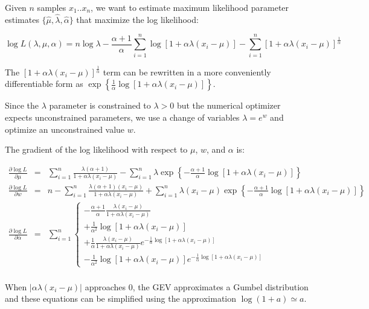 Given $n$ samples $x_1..x_n$, we want to estimate maximum likelihood
parameter estimates $\{ \hat{\mu}, \hat{\lambda}, \hat{\alpha} \}$
that maximize the log likelihood:

\begin{equation}
\log L(\lambda, \mu, \alpha) = n \log \lambda 
       - \frac{\alpha+1}{\alpha} 
           \sum_{i=1}^{n} \log\left[1+ \alpha\lambda(x_i - \mu) \right]
       - \sum_{i=1}^{n} \left[ 1 + \alpha\lambda (x_i - \mu) \right]^{\frac{1}{\alpha}}
\label{eqn:gev_logL}
\end{equation}

The $\left[ 1 + \alpha\lambda (x_i - \mu) \right]^{\frac{1}{\alpha}}$
term can be rewritten in a more conveniently differentiable form as
$\exp \left\{ \frac{1}{\alpha} \log \left[ 1 + \alpha\lambda (x_i - \mu)
\right] \right\}$.

Since the $\lambda$ parameter is constrained to $\lambda > 0$ but the
numerical optimizer expects unconstrained parameters, we use a change
of variables $\lambda = e^w$ and optimize an unconstrained value $w$.

The gradient of the log likelihood with respect to $\mu$, $w$, and
$\alpha$ is:

\begin{eqnarray}
\frac{\partial \log L}{\partial \mu} & = &
  \sum_{i=1}^n \frac{\lambda (\alpha+1)}{1+\alpha\lambda(x_i-\mu)} 
 -\sum_{i=1}^n \lambda \exp 
    \left\{ -\frac{\alpha+1}{\alpha} \log
          \left[1+\alpha\lambda(x_i-\mu)\right] \right\}
\\%
\label{eqn:gev_mupartial}
\frac{\partial \log L}{\partial w} & = &
  n - \sum_{i=1}^{n} \frac{\lambda (\alpha+1) (x_i - \mu)} 
                          {1 + \alpha \lambda (x_i - \mu)}
  + \sum_{i=1}^n \lambda (x_i - \mu) 
         \exp \left\{ -\frac{\alpha+1}{\alpha} \log
          \left[1+\alpha\lambda(x_i-\mu)\right] \right\}
\\%
\label{eqn:gev_wpartial}
\frac{\partial \log L}{\partial \alpha} & = &
   \sum_{i=1}^n \left\{
      \begin{array}{l}
      - \frac{\alpha+1}{\alpha} \frac{\lambda(x_i-\mu)}
                                  {1 +\alpha\lambda(x_i-\mu)}\\
      + \frac{1}{\alpha^2} \log \left[ 1 + \alpha\lambda(x_i - \mu) \right]\\
      + \frac{1}{\alpha} \frac{\lambda(x_i-\mu)}
                          {1 +\alpha\lambda(x_i-\mu)}
      e^{-\frac{1}{\alpha} \log\left[ 1 + \alpha\lambda(x_i - \mu) \right]}\\
     -  \frac{1}{\alpha^2} \log \left[ 1 + \alpha\lambda(x_i - \mu) \right]
      e^{-\frac{1}{\alpha} \log\left[ 1 + \alpha\lambda(x_i - \mu)
	 \right]} 
     \end{array}
     \right.
\\%
\label{eqn:gev_alphapartial}
\end{eqnarray}

When $|\alpha\lambda(x_i - \mu)|$ approaches $0$, the GEV approximates
a Gumbel distribution and these equations can be simplified using the
approximation $\log(1+a) \simeq a$.







